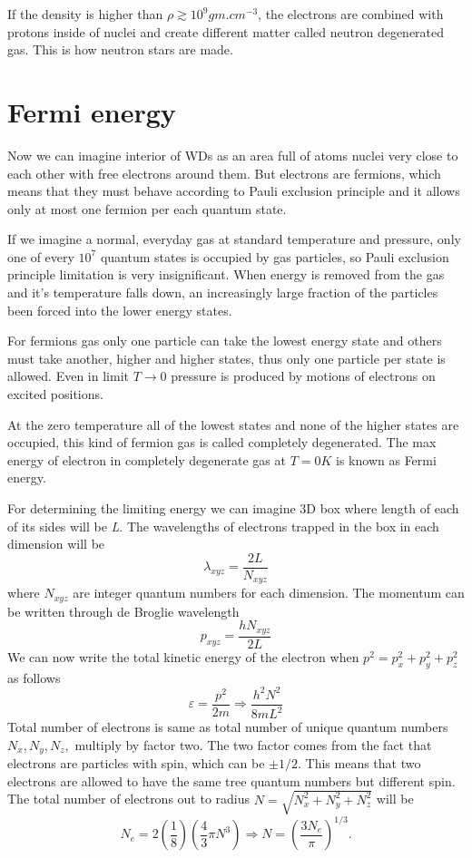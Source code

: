 \documentclass[oneside,a4paper,11pt]{report}
\begin{document}
If the density is higher than $\rho \gtrsim 10^9 gm.cm^{-3} $, the electrons are combined with protons inside of nuclei and 
create different matter called neutron degenerated gas. This is how neutron stars are made.    
 
\section{Fermi energy}
Now we can imagine interior of WDs as an area full of atoms nuclei very close to each other 
with free electrons around them. But electrons are fermions, which means that they must 
behave according to Pauli exclusion principle and it allows only at most one fermion 
per each quantum state. 

If we imagine a normal, everyday gas at standard temperature and pressure, only one 
of every $10^7$ quantum states is occupied by gas particles, so Pauli exclusion 
principle limitation is very insignificant. When energy is removed from the gas and 
it's temperature falls down, an increasingly large fraction of  the particles been 
forced into the lower energy states.

For fermions gas only one particle can take the lowest energy state and others must 
take another, higher and higher states, thus only one particle per state is allowed. 
Even in limit $T\rightarrow0$ pressure is produced by motions of electrons on excited positions.       

At the zero temperature all of the lowest states and none of the higher states are 
occupied, this kind of fermion gas is called completely degenerated. 
The max energy of electron in completely degenerate gas at $T=0 K$ is known as Fermi energy. 

For determining the limiting energy we can imagine 3D box where length of each of its sides will be \textit{L}.  
The wavelengths of electrons trapped in the box in each dimension will be
\begin{equation}
\lambda_{xyz} = \frac{2L}{N_{xyz}}
\end{equation}
where $N_{xyz}$ are integer quantum numbers for each dimension. The momentum can be written 
through de Broglie wavelength
\begin{equation}
p_{xyz} = \frac{hN_{xyz}}{2L}
\end{equation}
We can now write the total kinetic energy of the electron when $p^2 = p_x^2 + p_y^2 + p_z^2$ as follows
\begin{equation}
\label{ferm1}
 \varepsilon =  \frac{p^2}{2m} \Rightarrow \frac{h^2N^2}{8mL^2}
\end{equation}
Total number of electrons is same as total number of unique quantum numbers $N_x, N_y, N_z,$ multiply by 
factor two. The two factor comes from the fact that electrons are particles with spin, which can be $\pm 1/2$. 
This means that two electrons are allowed to have the same tree quantum numbers but different spin. 
The total number of electrons out to radius $N = \sqrt{N_x^2 + N_y^2 + N_z^2}$ will be
\begin{equation}
 N_e = 2\left ( \frac{1}{8} \right )\left ( \frac{4}{3} \pi N^3\right ) \Rightarrow N = \left ( \frac{3N_e}{\pi} \right )^{1/3} .
\end{equation}
\end{document}
